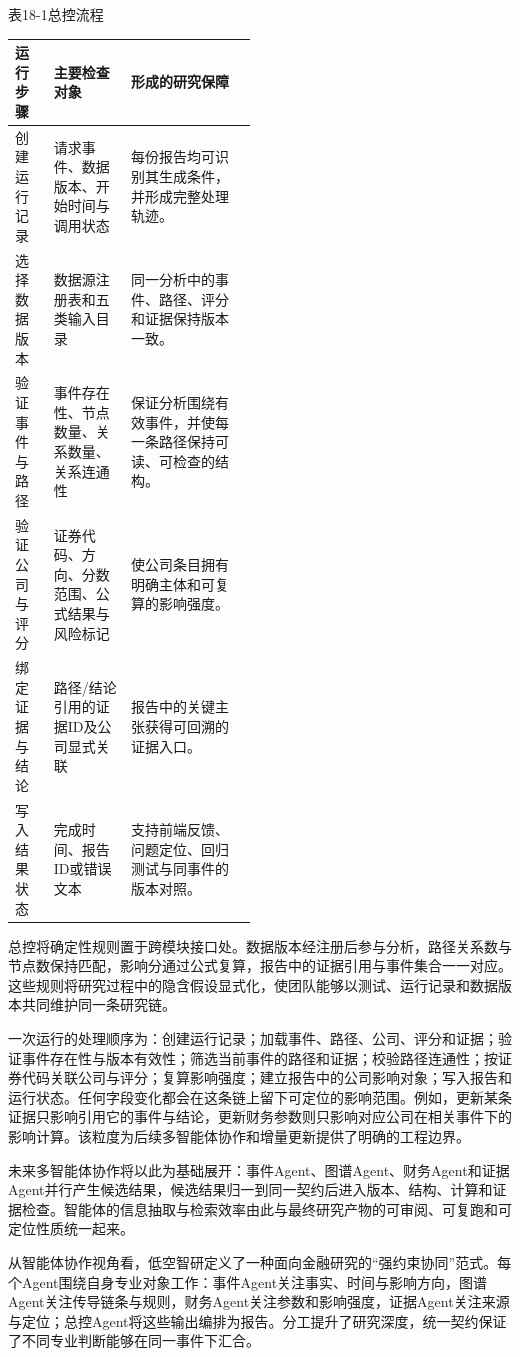 \begin{center}\small 表18-1\quad 总控流程\par\vspace{1mm}
\begin{tabularx}{\linewidth}{p{0.16\linewidth}p{0.32\linewidth}X}
\toprule
运行步骤 & 主要检查对象 & 形成的研究保障\\
\midrule
创建运行记录 & 请求事件、数据版本、开始时间与调用状态 & 每份报告均可识别其生成条件，并形成完整处理轨迹。\\
选择数据版本 & 数据源注册表和五类输入目录 & 同一分析中的事件、路径、评分和证据保持版本一致。\\
验证事件与路径 & 事件存在性、节点数量、关系数量、关系连通性 & 保证分析围绕有效事件，并使每一条路径保持可读、可检查的结构。\\
验证公司与评分 & 证券代码、方向、分数范围、公式结果与风险标记 & 使公司条目拥有明确主体和可复算的影响强度。\\
绑定证据与结论 & 路径/结论引用的证据ID及公司显式关联 & 报告中的关键主张获得可回溯的证据入口。\\
写入结果状态 & 完成时间、报告ID或错误文本 & 支持前端反馈、问题定位、回归测试与同事件的版本对照。\\
\bottomrule
\end{tabularx}\end{center}

总控将确定性规则置于跨模块接口处。数据版本经注册后参与分析，路径关系数与节点数保持匹配，影响分通过公式复算，报告中的证据引用与事件集合一一对应。这些规则将研究过程中的隐含假设显式化，使团队能够以测试、运行记录和数据版本共同维护同一条研究链\cite{lhy-contracts,lhy-orchestrator}。

一次运行的处理顺序为：创建运行记录；加载事件、路径、公司、评分和证据；验证事件存在性与版本有效性；筛选当前事件的路径和证据；校验路径连通性；按证券代码关联公司与评分；复算影响强度；建立报告中的公司影响对象；写入报告和运行状态。任何字段变化都会在这条链上留下可定位的影响范围。例如，更新某条证据只影响引用它的事件与结论，更新财务参数则只影响对应公司在相关事件下的影响计算。该粒度为后续多智能体协作和增量更新提供了明确的工程边界。

未来多智能体协作将以此为基础展开：事件Agent、图谱Agent、财务Agent和证据Agent并行产生候选结果，候选结果归一到同一契约后进入版本、结构、计算和证据检查。智能体的信息抽取与检索效率由此与最终研究产物的可审阅、可复跑和可定位性质统一起来。

从智能体协作视角看，低空智研定义了一种面向金融研究的“强约束协同”范式。每个Agent围绕自身专业对象工作：事件Agent关注事实、时间与影响方向，图谱Agent关注传导链条与规则，财务Agent关注参数和影响强度，证据Agent关注来源与定位；总控Agent将这些输出编排为报告。分工提升了研究深度，统一契约保证了不同专业判断能够在同一事件下汇合。


